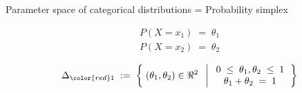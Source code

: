 
\newcommand{\poz}{{\color{red}p^{(1)}_{0}}}
\newcommand{\poo}{{\color{red}p^{(1)}_{1}}}
\newcommand{\pot}{{\color{red}p^{(1)}_{2}}}

\newcommand{\ptz}{{\color{blue}p^{(2)}_{0}}}
\newcommand{\pto}{{\color{blue}p^{(2)}_{1}}}

\newcommand{\phz}{{\color{green}p^{(3)}_{0}}}
\newcommand{\pho}{{\color{green}p^{(3)}_{1}}}

\newcommand{\pozz}{{\color{red}p^{(1)}_{0|0}}}
\newcommand{\pooz}{{\color{red}p^{(1)}_{1|0}}}

\newcommand{\ptzz}{{\color{blue}p^{(2)}_{0|0}}}
\newcommand{\ptoz}{{\color{blue}p^{(2)}_{1|0}}}

\newcommand{\phzz}{{\color{green}p^{(3)}_{0|0}}}
\newcommand{\phoz}{{\color{green}p^{(3)}_{1|0}}}

\newcommand{\pozo}{{\color{pink}p^{(1)}_{0|1}}}
\newcommand{\pooo}{{\color{pink}p^{(1)}_{1|1}}}

\newcommand{\ptzo}{{\color{cyan}p^{(2)}_{0|1}}}
\newcommand{\ptoo}{{\color{cyan}p^{(2)}_{1|1}}}

\newcommand{\phzo}{{\color{lime}p^{(3)}_{0|1}}}
\newcommand{\phoo}{{\color{lime}p^{(3)}_{1|1}}}

\begin{frame}{\Large Parameter space of categorical distributions = Probability simplex}

\begin{multicols}{2}

\begin{minipage}{5cm}
\vskip 1.5cm
\begin{equation*}
\begin{array}{c}
P(X=x_{1}) \;=\; \theta_{1} \\
P(X=x_{2}) \;=\; \theta_{2}
\end{array}
\end{equation*}
\end{minipage}

\newpage

\begin{minipage}{3cm}
\begin{flushright}

\end{flushright}
\end{minipage}

\end{multicols}

\vskip -0.2cm
\begin{equation*}
\Delta_{\color{red}1}
\; := \;
\left\{\;
(\theta_{1},\theta_{2}) \in \Re^{2}
\;\;\left\vert\;
\begin{array}{c}
	0 \;\leq\; \theta_{1}, \theta_{2} \;\leq\; 1 \\
	\theta_{1} + \theta_{2} \;=\; 1
\end{array}
\right.
\right\}
\end{equation*}

\end{frame}
\normalsize

